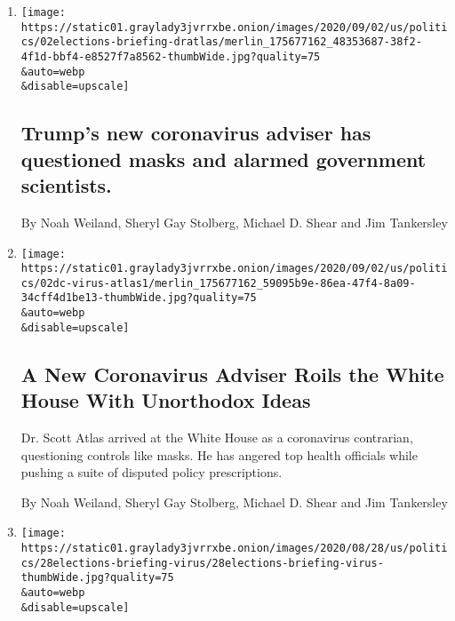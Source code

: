 \begin{enumerate}
\def\labelenumi{\arabic{enumi}.}
\item
  \href{/2020/09/02/us/elections/trumps-new-coronavirus-adviser-has-questioned-masks-and-alarmed-government-scientists.html}{}

  \texttt{[image: https://static01.graylady3jvrrxbe.onion/images/2020/09/02/us/politics/02elections-briefing-dratlas/merlin\_175677162\_48353687-38f2-4f1d-bbf4-e8527f7a8562-thumbWide.jpg?quality=75\\\&auto=webp\\\&disable=upscale]}

  \hypertarget{trumps-new-coronavirus-adviser-has-questioned-masks-and-alarmed-government-scientists}{%
  \subsection{Trump's new coronavirus adviser has questioned masks and
  alarmed government
  scientists.}\label{trumps-new-coronavirus-adviser-has-questioned-masks-and-alarmed-government-scientists}}

  By Noah Weiland, Sheryl Gay Stolberg, Michael D. Shear and Jim
  Tankersley
\item
  \href{/2020/09/02/us/politics/trump-scott-atlas-coronavirus.html}{}

  \texttt{[image: https://static01.graylady3jvrrxbe.onion/images/2020/09/02/us/politics/02dc-virus-atlas1/merlin\_175677162\_59095b9e-86ea-47f4-8a09-34cff4d1be13-thumbWide.jpg?quality=75\\\&auto=webp\\\&disable=upscale]}

  \hypertarget{a-new-coronavirus-adviser-roils-the-white-house-with-unorthodox-ideas}{%
  \subsection{A New Coronavirus Adviser Roils the White House With
  Unorthodox
  Ideas}\label{a-new-coronavirus-adviser-roils-the-white-house-with-unorthodox-ideas}}

  Dr. Scott Atlas arrived at the White House as a coronavirus
  contrarian, questioning controls like masks. He has angered top health
  officials while pushing a suite of disputed policy prescriptions.

  By Noah Weiland, Sheryl Gay Stolberg, Michael D. Shear and Jim
  Tankersley
\item
  \href{/live/2020/08/28/us/trump-vs-biden/the-republican-convention-tried-to-rewrite-the-history-of-trump-and-the-coronavirus}{}

  \texttt{[image: https://static01.graylady3jvrrxbe.onion/images/2020/08/28/us/politics/28elections-briefing-virus/28elections-briefing-virus-thumbWide.jpg?quality=75\\\&auto=webp\\\&disable=upscale]}


\end{enumerate}
